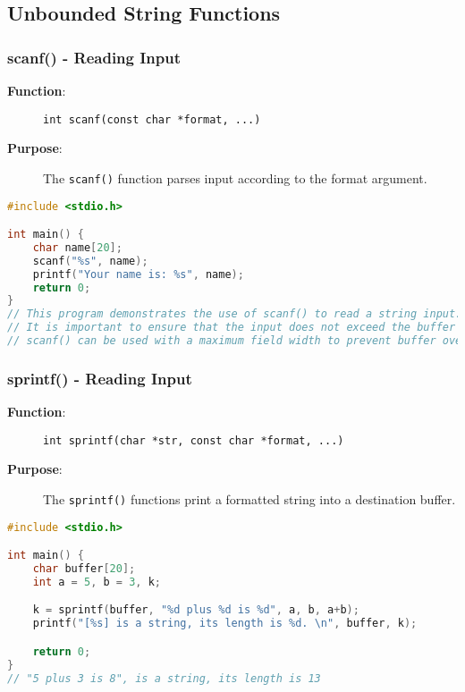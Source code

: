 \documentclass[11pt,a4paper]{article}
\begin{document}
\subsection{Unbounded String Functions}

\subsubsection{scanf() - Reading Input}

\begin{description}
    \item[\textbf{Function}:] \texttt{int scanf(const char *format, ...)}
    \item[\textbf{Purpose}:] The \texttt{scanf()} function parses input according to the format argument.
\end{description}

\begin{lstlisting}[language=C, caption=scanf Example]
#include <stdio.h>

int main() {
    char name[20];
    scanf("%s", name);
    printf("Your name is: %s", name);
    return 0;
}
// This program demonstrates the use of scanf() to read a string input.
// It is important to ensure that the input does not exceed the buffer size.
// scanf() can be used with a maximum field width to prevent buffer overflow.
\end{lstlisting}

\subsubsection{sprintf() - Reading Input}

\begin{description}
    \item[\textbf{Function}:] \texttt{int sprintf(char *str, const char *format, ...)}
    \item[\textbf{Purpose}:] The \texttt{sprintf()} functions print a formatted string into a destination buffer.
\end{description}

\begin{lstlisting}[language=C, caption=sprintf Example]
#include <stdio.h>

int main() {
    char buffer[20];
    int a = 5, b = 3, k;

    k = sprintf(buffer, "%d plus %d is %d", a, b, a+b);
    printf("[%s] is a string, its length is %d. \n", buffer, k);

    return 0;
}
// "5 plus 3 is 8", is a string, its length is 13
\end{lstlisting}
\end{document}
